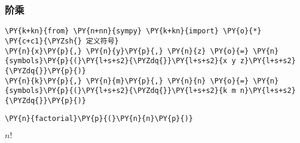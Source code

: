     \hypertarget{ux9636ux4e58}{%
\subsubsection{阶乘}\label{ux9636ux4e58}}

    \begin{tcolorbox}[breakable, size=fbox, boxrule=1pt, pad at break*=1mm,colback=cellbackground, colframe=cellborder]
\begin{Verbatim}[commandchars=\\\{\}]
\PY{k+kn}{from} \PY{n+nn}{sympy} \PY{k+kn}{import} \PY{o}{*}
\PY{c+c1}{\PYZsh{} 定义符号}
\PY{n}{x}\PY{p}{,} \PY{n}{y}\PY{p}{,} \PY{n}{z} \PY{o}{=} \PY{n}{symbols}\PY{p}{(}\PY{l+s+s2}{\PYZdq{}}\PY{l+s+s2}{x y z}\PY{l+s+s2}{\PYZdq{}}\PY{p}{)}
\PY{n}{k}\PY{p}{,} \PY{n}{m}\PY{p}{,} \PY{n}{n} \PY{o}{=} \PY{n}{symbols}\PY{p}{(}\PY{l+s+s2}{\PYZdq{}}\PY{l+s+s2}{k m n}\PY{l+s+s2}{\PYZdq{}}\PY{p}{)}
\end{Verbatim}
\end{tcolorbox}

    \begin{tcolorbox}[breakable, size=fbox, boxrule=1pt, pad at break*=1mm,colback=cellbackground, colframe=cellborder]
\begin{Verbatim}[commandchars=\\\{\}]
\PY{n}{factorial}\PY{p}{(}\PY{n}{n}\PY{p}{)}
\end{Verbatim}
\end{tcolorbox}
 
            
    
    $\displaystyle n!$
